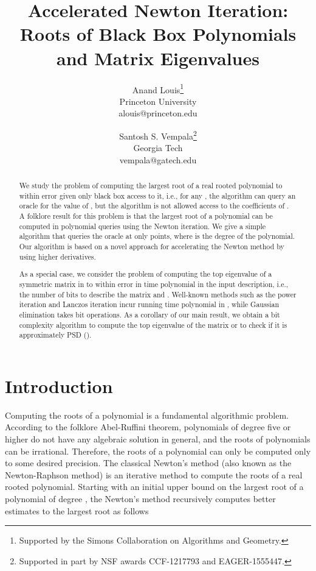 \documentclass{article}[12pt]
\title{Accelerated Newton Iteration:
 Roots of Black Box Polynomials\\ and Matrix Eigenvalues}
\author{Anand Louis\thanks{Supported by the Simons Collaboration on Algorithms and Geometry.}
\\Princeton University \\alouis@princeton.edu \and 
	Santosh S. Vempala\thanks{Supported in part by NSF awards CCF-1217793 and EAGER-1555447.}
 \\ Georgia Tech \\ vempala@gatech.edu}
\date{}
\theoremstyle{definition}
\begin{document}
\begin{titlepage}

\maketitle


\begin{abstract}
We study the problem of computing the largest root of a real rooted polynomial  to within error  given only 
black box access to it, i.e., for any , the algorithm can query an oracle for the
value of , but the algorithm is not allowed access to the coefficients of . 
A folklore result for this problem is that the largest root of a polynomial can be
computed in  polynomial queries 
using the Newton iteration.
We give a simple algorithm that queries the oracle at only  points,
where  is the degree of the polynomial.
Our algorithm is based on a novel approach for accelerating the Newton method by using higher derivatives.

As a special case, we consider the problem of computing the top eigenvalue of a symmetric matrix  in  to within error  in time polynomial in the input description, i.e., the number of bits to describe the matrix and . Well-known methods such as the power iteration and Lanczos iteration incur running time  
polynomial in , while Gaussian elimination takes  bit operations.
As a corollary of our main result, 
we obtain a   bit complexity algorithm to compute
the top eigenvalue of the matrix  or to check if it is approximately PSD ().
\end{abstract}

\end{titlepage}


\section{Introduction}

Computing the roots of a polynomial is a fundamental algorithmic 
problem. 
According to the folklore Abel-Ruffini theorem,
polynomials of degree five or higher do not have any algebraic solution in general,
and the roots of polynomials can be irrational. Therefore, the roots of a polynomial
can only be computed only to some desired precision. 
The classical Newton's method (also known as the Newton-Raphson method) is an 
iterative method to compute the roots of a real rooted polynomial.
Starting with an initial upper bound  on the largest root of a polynomial
 of degree , the Newton's method recursively computes better estimates
to the largest root as follows
 
\end{document}
